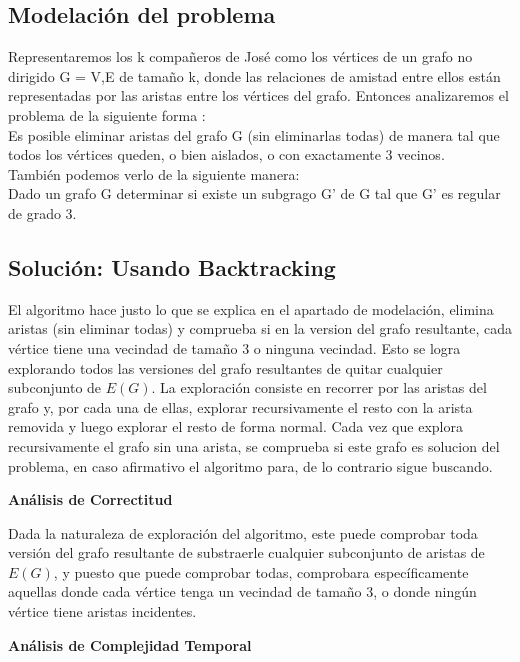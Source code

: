 \documentclass[
10pt, %
a4paper, %
oneside, %
headinclude,footinclude, %
BCOR5mm, %
]{scrartcl}
\begin{document}
\subsection{Modelación del problema}

Representaremos los k compañeros de José como los vértices de un grafo no dirigido G = {V,E} de tamaño k, donde las relaciones de amistad entre ellos están representadas
por las aristas entre los vértices del grafo. Entonces analizaremos el problema de la siguiente forma :\\

Es posible eliminar aristas del grafo G (sin eliminarlas todas) de manera tal que todos los vértices queden, o bien aislados, o con exactamente 3 vecinos. \\

También podemos verlo de la siguiente manera: \\

Dado un grafo G determinar si existe un subgrago G' de G tal que G' es regular de grado 3.\\


\subsection{Solución: Usando Backtracking}

El algoritmo hace justo lo que se explica en el apartado de modelación, elimina aristas (sin eliminar todas) y comprueba si
en la version del grafo resultante, cada vértice tiene una vecindad de tamaño 3 o ninguna vecindad. Esto se logra explorando
todos las versiones del grafo resultantes de quitar cualquier subconjunto de $E(G)$. La exploración consiste en recorrer por
las aristas del grafo y, por cada una de ellas, explorar recursivamente el resto con la arista removida y luego explorar el resto
de forma normal. Cada vez que explora recursivamente el grafo sin una arista, se comprueba si este grafo es solucion del problema,
en caso afirmativo el algoritmo para, de lo contrario sigue buscando.


\textbf{Análisis de Correctitud}

Dada la naturaleza de exploración del algoritmo, este puede comprobar toda versión del grafo resultante de substraerle cualquier
subconjunto de aristas de $E(G)$, y puesto que puede comprobar todas, comprobara específicamente aquellas donde cada vértice tenga
un vecindad de tamaño 3, o donde ningún vértice tiene aristas incidentes.


\textbf{Análisis de Complejidad Temporal}\\
\end{document}
